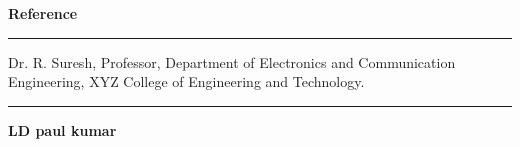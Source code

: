 \documentclass[10pt,a4paper]{article}
\begin{document}

\vspace{15pt}

{\normalsize\bfseries Reference}

\vspace{-5pt}

\noindent
\rule{1.6in}{1.5pt}

\vspace{2pt}

Dr. R. Suresh, Professor, Department of Electronics and Communication Engineering, XYZ College of Engineering and Technology.


\vspace{35pt}

\noindent
\rule{1.75in}{0.5pt}

\vspace{2pt}

\textbf{LD paul kumar}

\end{document}
